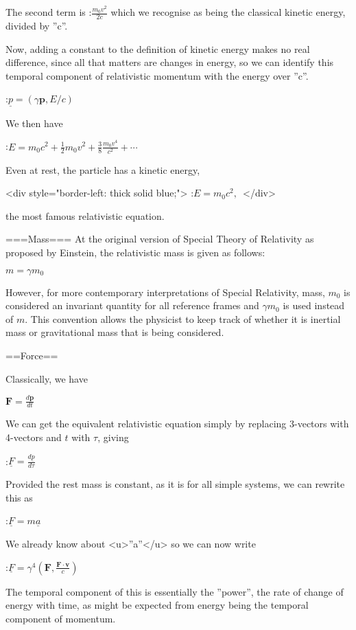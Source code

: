 \documentclass{article}
\begin{document}
The second term is 
:$\frac{m_0 v^2}{2c}$
which we recognise as being the classical kinetic energy, divided by ''c''.

Now, adding a constant to the definition of kinetic energy makes no real difference, since all that matters are changes in energy, so we can identify this temporal component of relativistic momentum with the energy over ''c''.

:$\underline{p}= (\gamma \mathbf{p}, E/c)$

We then have

:$E = m_0 c^2 + \frac{1}{2}m_0 v^2 + \frac{3}{8}\frac{m_0 v^4}{c^2} 
+ \cdots  $

Even at rest, the particle has a kinetic energy,

<div style="border-left: thick solid blue;">
:$E=m_0 c^2, \,$
</div>

the most famous relativistic equation.



===Mass===
At the original version of Special Theory of Relativity as proposed by Einstein, the relativistic mass is given as follows:

$m = \gamma m_0$

However, for more contemporary interpretations of Special Relativity, mass, $m_0$
is considered an invariant quantity for all reference frames and $\gamma m_0$ is used instead of $m$.  This convention allows the physicist to keep track of whether it is inertial mass or gravitational mass that is being considered.


==Force==

Classically, we have

$\mathbf{F}= \frac{d\mathbf{p}}{dt} $

We can get the equivalent relativistic equation simply by replacing 3-vectors with 4-vectors and $t$ with $\tau$, giving

:$\underline{F} = \frac{d\underline{p}}{d\tau}$

Provided the rest mass is constant, as it is for all simple systems, we can rewrite this as  

:$\underline{F} = m \underline{a}$

We already know about <u>''a''</u> so we can now write

:$\underline{F} = \gamma^4 \left( \mathbf{F}, 
\frac{ \mathbf{F} \cdot \mathbf{v} }{c} \right) $

The temporal component of this is essentially the ''power'', the rate of change of energy with time, as might be expected from energy being the temporal component of momentum.
\end{document}

